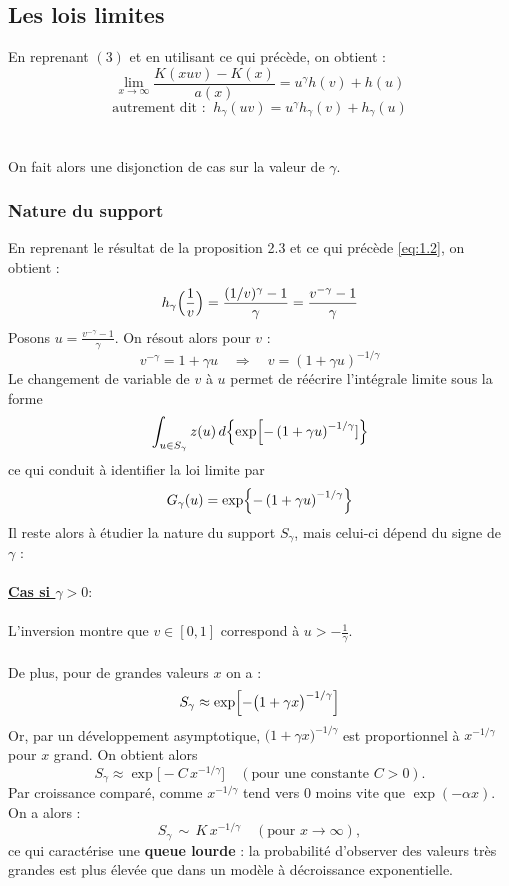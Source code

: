 \documentclass{article}
\theoremstyle{plain}
\theoremstyle{definition}
\theoremstyle{plain}
\begin{document}
\subsection{Les lois limites}
En reprenant $(3)$ et en utilisant ce qui précède, on obtient :
\[
\lim_{x\to \infty} \frac{K(xuv) - K(x)}{a(x)} = u^{\gamma} h(v) + h(u)
\]
\[
\text{autrement dit :} \; \; h_{\gamma}(uv)= u^{\gamma} h_{\gamma}(v) + h_{\gamma}(u)
\]
\\
\\
On fait alors une disjonction de cas sur la valeur de $\gamma$.
\\
\subsubsection{Nature du support}

En reprenant le résultat de la proposition 2.3 et ce qui précède \eqref{eq:1.2}, on obtient :
\[
h_\gamma\Bigl(\frac{1}{v}\Bigr)=\frac{(1/v)^\gamma-1}{\gamma}=\frac{v^{-\gamma}-1}{\gamma}
\]
Posons \(u=\frac{v^{-\gamma}-1}{\gamma}\). On résout alors pour \(v\) :
\[
v^{-\gamma}=1+\gamma u\quad\Longrightarrow\quad v=(1+\gamma u)^{-1/\gamma}
\]
Le changement de variable de \(v\) à \(u\) permet de réécrire l'intégrale limite sous la forme
\[
\int_{u\in S_\gamma} z(u)\,d\Bigl\{\exp\Bigl[-\left(1+\gamma u\right)^{-1/\gamma}]\Bigr\}
\]
ce qui conduit à identifier la loi limite par
\[
G_\gamma(u)=\exp\Bigl\{-\left(1+\gamma u\right)^{-1/\gamma}\Bigr\}
\]
Il reste alors à étudier la nature du support \(S_\gamma\), mais celui-ci dépend du signe de \(\gamma\) :
\\
\\
\textbf{\underline{Cas si \(\gamma>0 : \)}}
\\
\\
L'inversion montre que \(v\in [0,1]\) correspond à \(u>-\frac{1}{\gamma}\).
\\
\\
De plus, pour de grandes valeurs \(x\) on a :
\[
S_{\gamma} \approx \exp\Bigl[-\bigl(1 + \gamma x\bigr)^{-1/\gamma}\Bigr]
\]
Or, par un développement asymptotique,  \(\bigl(1 + \gamma x\bigr)^{-1/\gamma}\) est proportionnel à \(x^{-1/\gamma}\) pour \(x\) grand. On obtient alors
\[
S_{\gamma} \approx \exp\bigl[-C\,x^{-1/\gamma}\bigr] 
\quad (\text{pour une constante } C>0).
\]
Par croissance comparé, comme \(x^{-1/\gamma}\) tend vers 0 moins vite que \(\exp(-\alpha x)\). On a alors : 
\[
S_{\gamma}\,\sim\, K\,x^{-1/\gamma} 
\quad (\text{pour } x\to\infty),
\]
ce qui caractérise une \textbf{queue lourde} : la probabilité d'observer des valeurs très grandes est plus élevée que dans un modèle à décroissance exponentielle.
\end{document}
